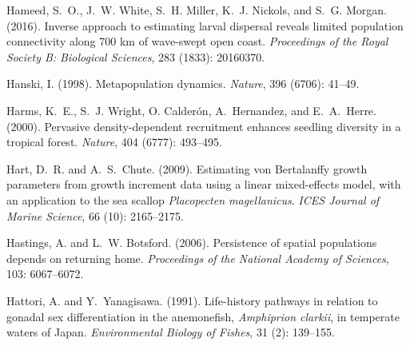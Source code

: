 \documentclass[12pt, oneside]{article}   	%
\begin{document}
\begin{thebibliography}{66}

Hameed, S.~O., J.~W. White, S.~H. Miller, K.~J. Nickols, and S.~G.
  Morgan. (2016).
\newblock Inverse approach to estimating larval dispersal reveals limited
  population connectivity along 700 km of wave-swept open coast.
\newblock \emph{Proceedings of the Royal Society B: Biological Sciences},
  283 (1833): 20160370.

Hanski, I. (1998).
\newblock Metapopulation dynamics.
\newblock \emph{Nature}, 396 (6706): 41--49.

Harms, K.~E., S.~J. Wright, O. Calder{\'o}n, A.~Hernandez, and
  E.~A.~Herre. (2000).
\newblock Pervasive density-dependent recruitment enhances seedling diversity
  in a tropical forest.
\newblock \emph{Nature}, 404 (6777): 493--495.

Hart, D.~R. and A.~S.~Chute. (2009).
\newblock Estimating von Bertalanffy growth parameters from growth increment
  data using a linear mixed-effects model, with an application to the sea
  scallop \textit{Placopecten magellanicus}.
\newblock \emph{ICES Journal of Marine Science}, 66 (10):
  2165--2175.

Hastings, A. and L.~W. Botsford. (2006).
\newblock Persistence of spatial populations depends on returning home.
\newblock \emph{Proceedings of the National Academy of Sciences}, 103:
  6067--6072.

Hattori, A. and Y.~Yanagisawa. (1991).
\newblock Life-history pathways in relation to gonadal sex differentiation in
  the anemonefish, \textit{Amphiprion clarkii}, in temperate waters of Japan.
\newblock \emph{Environmental Biology of Fishes}, 31 (2):
  139--155.


\end{thebibliography}
\end{document}
